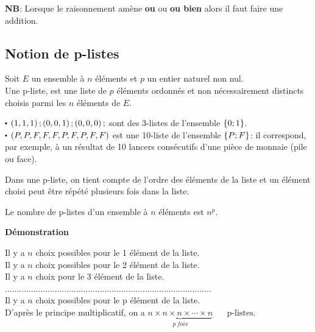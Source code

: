 \textbf{NB}: Lorsque le raisonnement amène \textbf{ou} ou \textbf{ou bien}  alors il faut faire une  addition.

\subsection{ Notion de   p-listes}

\begin{definition}

Soit $ E $ un ensemble à $ n $ éléments et $ p $ un entier naturel non nul.\\
Une p-liste, est une liste  de $ p $ éléments ordonnés et non nécessairement distincts choisis parmi les $ n $ éléments de $ E $.
\end{definition}


\begin{example}

$ \centerdot $ $ \left(1,1,1\right); \left(0,0,1\right);\left(0,0,0\right); $ sont des 3-listes de l'ensemble $ \left\{0;1\right\} $.\\
$ \centerdot $  $ \left(P,P,F,F,F,P,F,P,F,F\right) $ est une 10-liste de l'ensemble $ \left\{P;F\right\} $: il correspond, par exemple, à un résultat de 10 lancers consécutifs d'une pièce de monnaie (pile ou face).
\end{example}

\begin{remark}

Dans une  p-liste, on tient compte de l'ordre des éléments de la liste et un élément choisi peut être répété plusieurs fois dans la liste.
\end{remark}
\begin{theorem}

Le nombre de p-listes  d'un ensemble à $ n $ éléments est $ n^{p}. $
\end{theorem}

\textbf{Démonstration}

Il y a $ n $ choix possibles pour  le 1 élément de la liste.\\
Il y a $ n $ choix possibles pour  le 2 élément de la liste.\\
Il y a $ n $ choix pour  le 3 élément de la liste.\\
.......................................................................................\\
Il y a $ n $ choix possibles pour le p élément de la liste.\\
D'après le principe multiplicatif, on a $\underbrace{ n \times n \times n \times \cdots \times n }_{p\  fois}$  $\quad\textrm{ p-listes} $.

